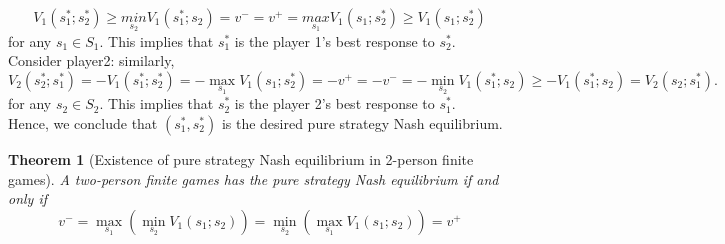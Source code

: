 \documentclass[twoside]{article}
\theoremstyle{definitionstyle}
\newtheorem*{theorem}{Theorem}
\begin{document}
\[V_1(s_1^*;s_2^*) \geq \underset{s_2}{min}V_1(s_1^*;s_2) = v^- = v^+ = \underset{s_1}{max}V_1(s_1;s_2^*) \geq V_1(s_1; s_2^*)\]
for any $s_1\in S_1$. This implies that $s_1^*$ is the player 1's best response to $s_2^*$.\\
Consider player2: similarly, \[
V_2(s_2^*; s_1^*) = -V_1(s_1^*; s_2^*) = - \max_{s_1} V_1(s_1; s_2^*) = -v^+ = -v^- = - \min_{s_2} V_1(s_1^*; s_2)
\ge -V_1(s_1^*; s_2) = V_2(s_2; s_1^*).
\]
for any $s_2 \in S_2$. This implies that $s_2^*$ is the player 2's best response to $s_1^*$. \\
Hence, we conclude that $(s_1^*,s_2^*)$ is the desired pure strategy Nash equilibrium. 
\begin{theorem}[Existence of pure strategy Nash equilibrium in 2-person finite games]
   A two-person finite games has the pure strategy Nash equilibrium if and only if  
   \[v^- = \underset{s_1}{\max}(\underset{s_2}{\min}V_1(s_1;s_2)) = \underset{s_2}{\min}(\underset{s_1}{\max}V_1(s_1;s_2)) = v^+\]
\end{theorem}
\end{document}
